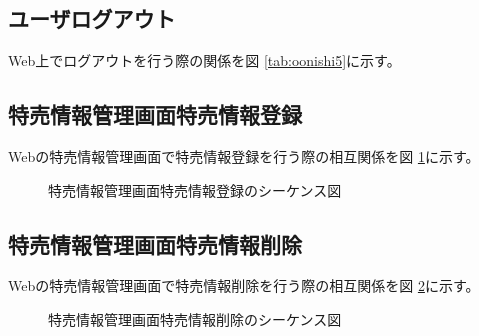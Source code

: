 \documentclass[a4j]{jarticle}
\begin{document}
\subsection{ユーザログアウト}%
Web上でログアウトを行う際の関係を図 \ref {tab:oonishi5}に示す。
\subsection{特売情報管理画面特売情報登録}
Webの特売情報管理画面で特売情報登録を行う際の相互関係を図 \ref {tab:oonishi21}に示す。
\begin{figure}[H]
\begin{center}
\caption{特売情報管理画面特売情報登録のシーケンス図}
\label{tab:oonishi21}
\end{center}
\end{figure}
\subsection{特売情報管理画面特売情報削除}
Webの特売情報管理画面で特売情報削除を行う際の相互関係を図 \ref {tab:oonishi22}に示す。
\begin{figure}[H]
\begin{center}
\caption{特売情報管理画面特売情報削除のシーケンス図}
\label{tab:oonishi22}
\end{center}
\end{figure}
\end{document}
